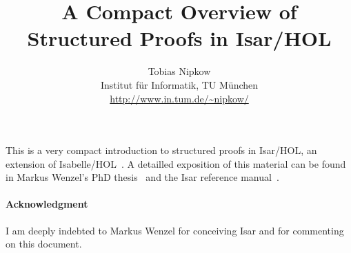\documentclass[11pt,a4paper]{article}
\begin{document}
\title{A Compact Overview of Structured Proofs in Isar/HOL}
\author{Tobias Nipkow\\Institut f{\"u}r Informatik, TU M{\"u}nchen\\
 \url{http://www.in.tum.de/~nipkow/}}
\date{}
\maketitle

\noindent
This is a very compact introduction to structured proofs in
Isar/HOL, an extension of Isabelle/HOL~\cite{LNCS2283}. A detailled
exposition of this material can be found in Markus Wenzel's PhD
thesis~\cite{Wenzel-PhD} and the Isar reference manual~\cite{Isar-Ref-Man}.



%


\paragraph{Acknowledgment}
I am deeply indebted to Markus Wenzel for conceiving Isar and for
commenting on this document.

\begingroup
 \small\raggedright\frenchspacing

\endgroup
\end{document}
